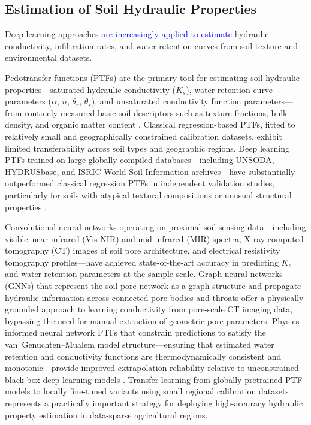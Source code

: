 \documentclass[land,article,submit,pdftex,moreauthors]{Definitions/mdpi}
\numberwithin{equation}{section}
\begin{document}
\normalsize

\subsection{Estimation of Soil Hydraulic Properties}

Deep learning approaches \textcolor{blue}{are increasingly applied to estimate} hydraulic conductivity, infiltration rates, and water retention curves from soil texture and environmental datasets.

Pedotransfer functions (PTFs) are the primary tool for estimating soil hydraulic properties---saturated hydraulic conductivity ($K_s$), water retention curve parameters ($\alpha$, $n$, $\theta_r$, $\theta_s$), and unsaturated conductivity function parameters---from routinely measured basic soil descriptors such as texture fractions, bulk density, and organic matter content \citep{wosten2001pedotransfer}. Classical regression-based PTFs, fitted to relatively small and geographically constrained calibration datasets, exhibit limited transferability across soil types and geographic regions. Deep learning PTFs trained on large globally compiled databases---including UNSODA, HYDRUSbase, and ISRIC World Soil Information archives---have substantially outperformed classical regression PTFs in independent validation studies, particularly for soils with atypical textural compositions or unusual structural properties \citep{zhang2018deep}.

Convolutional neural networks operating on proximal soil sensing data---including visible--near-infrared (Vis-NIR) and mid-infrared (MIR) spectra, X-ray computed tomography (CT) images of soil pore architecture, and electrical resistivity tomography profiles---have achieved state-of-the-art accuracy in predicting $K_s$ and water retention parameters at the sample scale. Graph neural networks (GNNs) that represent the soil pore network as a graph structure and propagate hydraulic information across connected pore bodies and throats offer a physically grounded approach to learning conductivity from pore-scale CT imaging data, bypassing the need for manual extraction of geometric pore parameters. Physics-informed neural network PTFs that constrain predictions to satisfy the van~Genuchten--Mualem model structure---ensuring that estimated water retention and conductivity functions are thermodynamically consistent and monotonic---provide improved extrapolation reliability relative to unconstrained black-box deep learning models \citep{karniadakis2021physics}. Transfer learning from globally pretrained PTF models to locally fine-tuned variants using small regional calibration datasets represents a practically important strategy for deploying high-accuracy hydraulic property estimation in data-sparse agricultural regions.
\end{document}

